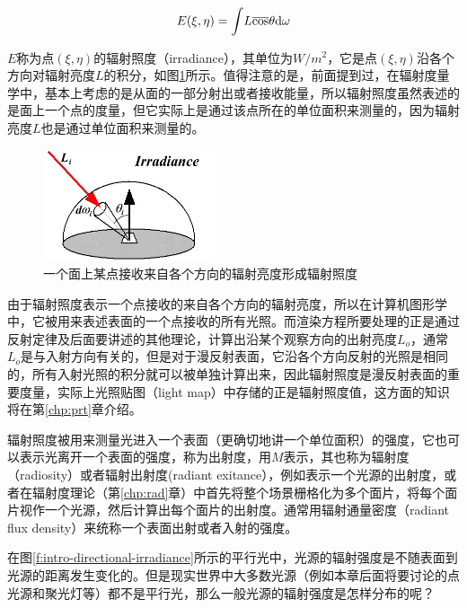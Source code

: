 \begin{equation}
	E(\xi,\eta)={\rm \int} L\overline{\cos}\theta {\rm d}\omega
\end{equation}

$E$称为点$(\xi,\eta)$的辐射照度（irradiance），其单位为$W/m^2$，它是点$(\xi,\eta)$沿各个方向对辐射亮度$L$的积分，如图\ref{f:intro-irradiance}所示。值得注意的是，前面提到过，在辐射度量学中，基本上考虑的是从面的一部分射出或者接收能量，所以辐射照度虽然表述的是面上一个点的度量，但它实际上是通过该点所在的单位面积来测量的，因为辐射亮度$L$也是通过单位面积来测量的。

\begin{figure}
\sidecaption
	\includegraphics[width=0.45\textwidth]{figures/intro/irradiance}
	\caption{一个面上某点接收来自各个方向的辐射亮度形成辐射照度}
	\label{f:intro-irradiance}
\end{figure}

由于辐射照度表示一个点接收的来自各个方向的辐射亮度，所以在计算机图形学中，它被用来表述表面的一个点接收的所有光照。而渲染方程所要处理的正是通过反射定律及后面要讲述的其他理论，计算出沿某个观察方向的出射亮度$L_o$，通常$L_o$是与入射方向有关的，但是对于漫反射表面，它沿各个方向反射的光照是相同的，所有入射光照的积分就可以被单独计算出来，因此辐射照度是漫反射表面的重要度量，实际上光照贴图（light map）中存储的正是辐射照度值，这方面的知识将在第\ref{chp:prt}章介绍。

辐射照度被用来测量光进入一个表面（更确切地讲一个单位面积）的强度，它也可以表示光离开一个表面的强度，称为出射度，用$M$表示，其也称为辐射度（radiosity）或者辐射出射度(radiant exitance），例如表示一个光源的出射度，或者在辐射度理论（第\ref{chp:rad}章）中首先将整个场景栅格化为多个面片，将每个面片视作一个光源，然后计算出每个面片的出射度。通常用辐射通量密度（radiant flux density）来统称一个表面出射或者入射的强度。

在图\ref{f:intro-directional-irradiance}所示的平行光中，光源的辐射强度是不随表面到光源的距离发生变化的。但是现实世界中大多数光源（例如本章后面将要讨论的点光源和聚光灯等）都不是平行光，那么一般光源的辐射强度是怎样分布的呢？

